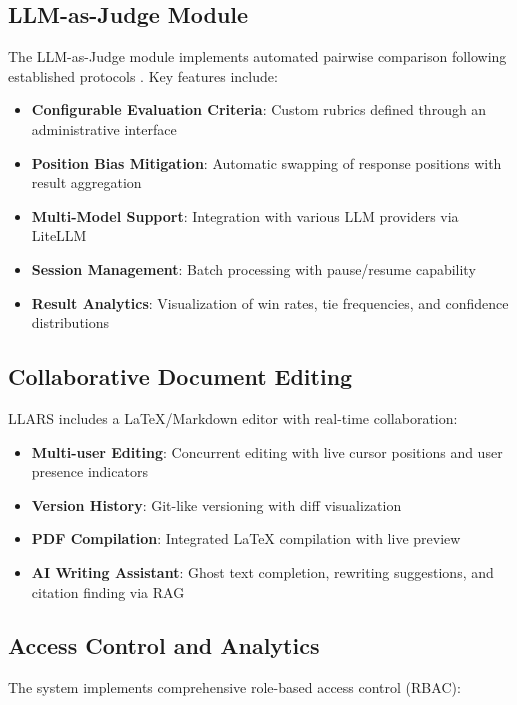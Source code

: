 \documentclass[11pt]{article}
\begin{document}
\subsection{LLM-as-Judge Module}

The LLM-as-Judge module implements automated pairwise comparison following established protocols \cite{zheng2023judging}.
Key features include:

\begin{itemize}
    \item \textbf{Configurable Evaluation Criteria}: Custom rubrics defined through an administrative interface
    \item \textbf{Position Bias Mitigation}: Automatic swapping of response positions with result aggregation
    \item \textbf{Multi-Model Support}: Integration with various LLM providers via LiteLLM
    \item \textbf{Session Management}: Batch processing with pause/resume capability
    \item \textbf{Result Analytics}: Visualization of win rates, tie frequencies, and confidence distributions
\end{itemize}

\subsection{Collaborative Document Editing}

LLARS includes a LaTeX/Markdown editor with real-time collaboration:

\begin{itemize}
    \item \textbf{Multi-user Editing}: Concurrent editing with live cursor positions and user presence indicators
    \item \textbf{Version History}: Git-like versioning with diff visualization
    \item \textbf{PDF Compilation}: Integrated LaTeX compilation with live preview
    \item \textbf{AI Writing Assistant}: Ghost text completion, rewriting suggestions, and citation finding via RAG
\end{itemize}

\subsection{Access Control and Analytics}

The system implements comprehensive role-based access control (RBAC):
\end{document}
